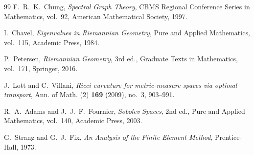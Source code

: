 \documentclass[11pt]{article}
\numberwithin{equation}{section}
\theoremstyle{definition}
\theoremstyle{remark}
\begin{document}
\begin{thebibliography}{99}
F.~R.~K.~Chung,
\emph{Spectral Graph Theory},
CBMS Regional Conference Series in Mathematics, vol.~92,
American Mathematical Society, 1997.

I.~Chavel,
\emph{Eigenvalues in Riemannian Geometry},
Pure and Applied Mathematics, vol.~115, Academic Press, 1984.

P.~Petersen,
\emph{Riemannian Geometry},
3rd ed., Graduate Texts in Mathematics, vol.~171, Springer, 2016.

J.~Lott and C.~Villani,
\emph{Ricci curvature for metric-measure spaces via optimal transport},
Ann. of Math. (2) \textbf{169} (2009), no.~3, 903--991.

R.~A.~Adams and J.~J.~F.~Fournier,
\emph{Sobolev Spaces},
2nd ed., Pure and Applied Mathematics, vol.~140, Academic Press, 2003.

G.~Strang and G.~J.~Fix,
\emph{An Analysis of the Finite Element Method},
Prentice-Hall, 1973.

\end{thebibliography}
\end{document}
